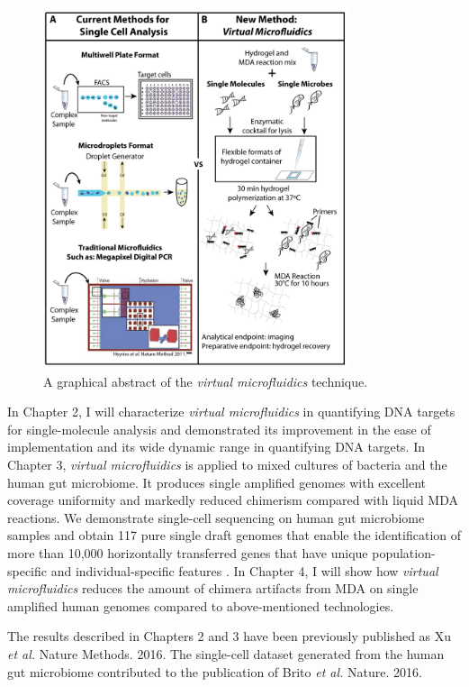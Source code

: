 \begin{figure}[ht!]
\centering
\includegraphics[keepaspectratio,width=0.8\textwidth]{./figures/SolidPhaseWGA-20}
\caption[A graphical abstract of the \textit{virtual microfluidics} technique]{A graphical abstract of the \textit{virtual microfluidics} technique.}
\label{fig:FigAbstract}
\end{figure}

In Chapter 2, I will characterize \textit{virtual microfluidics} in quantifying DNA targets for single-molecule analysis and demonstrated its improvement in the ease of implementation and its wide dynamic range in quantifying DNA targets. In Chapter 3, \textit{virtual microfluidics} is applied to mixed cultures of bacteria and the human gut microbiome. It produces single amplified genomes with excellent coverage uniformity and markedly reduced chimerism compared with liquid MDA reactions. We demonstrate single-cell sequencing on human gut microbiome samples and obtain 117 pure single draft genomes that enable the identification of more than 10,000 horizontally transferred genes that have unique population-specific and individual-specific features \cite{Brito:2016cd}. In Chapter 4, I will show how \textit{virtual microfluidics} reduces the amount of chimera artifacts from MDA on single amplified human genomes compared to above-mentioned technologies. 
 
The results described in Chapters 2 and 3 have been previously published as Xu \textit{et al.} Nature Methods. 2016. The single-cell dataset generated from the human gut microbiome contributed to the publication of Brito \textit{et al.} Nature. 2016.